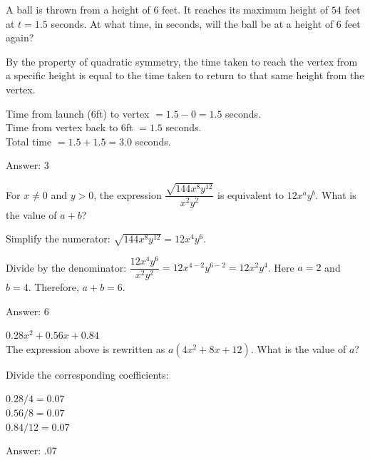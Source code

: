 \documentclass[11pt,paper=a4,answers]{exam}
\begin{document}
\begin{questions}
\vspace{1cm}

\question
A ball is thrown from a height of $6$ feet. It reaches its maximum height of $54$ feet at $t = 1.5$ seconds. At what time, in seconds, will the ball be at a height of $6$ feet again?

\begin{solution}
By the property of quadratic symmetry, the time taken to reach the vertex from a specific height is equal to the time taken to return to that same height from the vertex.
\vspace{5pt}
\begin{center}
Time from launch ($6$ft) to vertex $= 1.5 - 0 = 1.5$ seconds. \\
Time from vertex back to $6$ft $= 1.5$ seconds. \\
Total time $= 1.5 + 1.5 = 3.0$ seconds.
\end{center}
\vspace{5pt}
Answer: \colorbox{yellow!100}{3}
\end{solution}

\vspace{1cm}

\question
For $x \neq 0$ and $y > 0$, the expression $\dfrac{\sqrt{144x^8y^{12}}}{x^2y^2}$ is equivalent to $12x^ay^b$. What is the value of $a + b$?

\begin{solution}
Simplify the numerator: $\sqrt{144x^8y^{12}} = 12x^4y^6$.
\vspace{5pt}
\begin{center}
Divide by the denominator: $\dfrac{12x^4y^6}{x^2y^2} = 12x^{4-2}y^{6-2} = 12x^2y^4$.
\vspace{5pt}
Here $a=2$ and $b=4$. Therefore, $a+b = 6$.
\end{center}
\vspace{5pt}
Answer: \colorbox{yellow!100}{6}
\end{solution}

\vspace{1cm}

\question
$0.28x^2 + 0.56x + 0.84$ \\
The expression above is rewritten as $a(4x^2 + 8x + 12)$. What is the value of $a$?

\begin{solution}
Divide the corresponding coefficients:
\vspace{5pt}
\begin{center}
$0.28 / 4 = 0.07$ \\
$0.56 / 8 = 0.07$ \\
$0.84 / 12 = 0.07$
\end{center}
\vspace{5pt}
Answer: \colorbox{yellow!100}{.07}
\end{solution}


\end{questions}
\end{document}
